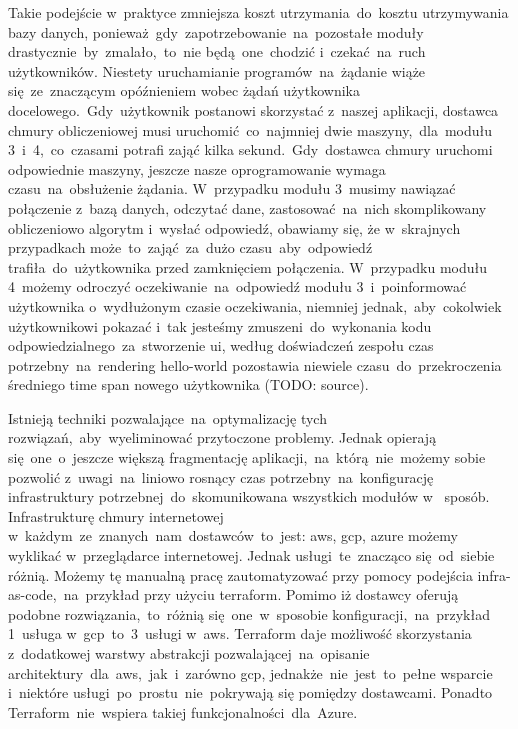 Takie podejście w~praktyce zmniejsza koszt utrzymania~do~kosztu utrzymywania bazy danych, ponieważ~gdy~zapotrzebowanie~na~pozostałe moduły drastycznie~by~zmalało,~to~nie będą~one~chodzić i~czekać~na~ruch użytkowników.
Niestety uruchamianie programów~na~żądanie wiąże się~ze~znaczącym opóźnieniem wobec żądań użytkownika docelowego.~Gdy~użytkownik postanowi skorzystać z~naszej aplikacji, dostawca chmury obliczeniowej musi uruchomić~co~najmniej dwie maszyny,~dla~modułu 3~i~4,~co~czasami potrafi zająć kilka sekund.~Gdy~dostawca chmury uruchomi odpowiednie maszyny, jeszcze nasze oprogramowanie wymaga czasu~na~obsłużenie żądania.
W~przypadku modułu 3~musimy nawiązać połączenie z~bazą danych, odczytać dane, zastosować~na~nich skomplikowany obliczeniowo algorytm i~wysłać odpowiedź, obawiamy się, że w~skrajnych przypadkach może~to~zająć~za~dużo czasu~aby~odpowiedź trafiła~do~użytkownika przed zamknięciem połączenia.
W~przypadku modułu 4~możemy odroczyć oczekiwanie~na~odpowiedź modułu 3~i~poinformować użytkownika o~wydłużonym czasie oczekiwania, niemniej jednak,~aby~cokolwiek użytkownikowi pokazać i~tak jesteśmy zmuszeni~do~wykonania kodu odpowiedzialnego~za~stworzenie \gls{ui}, według doświadczeń zespołu czas potrzebny~na~\gls{rendering} \gls{hello-world} pozostawia niewiele czasu~do~przekroczenia średniego time span nowego użytkownika (TODO: source).

Istnieją techniki pozwalające~na~optymalizację tych rozwiązań,~aby~wyeliminować przytoczone problemy.
Jednak opierają się~one~o~jeszcze większą fragmentację aplikacji,~na~którą~nie~możemy sobie pozwolić z~uwagi~na~liniowo rosnący czas potrzebny~na~konfigurację infrastruktury potrzebnej~do~skomunikowana wszystkich modułów w~ sposób.
Infrastrukturę chmury internetowej w~każdym~ze~znanych~nam~dostawców~to~jest: \acrshort{aws}, \acrshort{gcp}, \acrshort{azure} możemy wyklikać w~przeglądarce internetowej.
Jednak usługi~te~znacząco się~od~siebie różnią.
Możemy tę manualną pracę zautomatyzować przy pomocy podejścia \gls{infra-as-code},~na~przykład przy użyciu terraform.
Pomimo iż dostawcy oferują podobne rozwiązania,~to~różnią się~one~w~sposobie konfiguracji,~na~przykład 1~usługa w~\acrshort{gcp}~to~3~usługi w~\acrshort{aws}\@.
Terraform daje możliwość skorzystania z~dodatkowej warstwy abstrakcji pozwalającej~na~opisanie architektury~dla~\acrshort{aws},~jak~i~zarówno \acrshort{gcp}, jednakże~nie~jest~to~pełne wsparcie i~niektóre usługi~po~prostu~nie~pokrywają się pomiędzy dostawcami.
Ponadto Terraform~nie~wspiera takiej funkcjonalności~dla~Azure.

